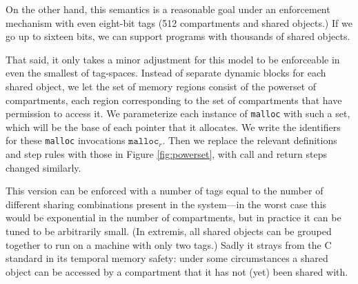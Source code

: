\documentclass{article}
\begin{document}
On the other hand, this semantics is a reasonable goal under an enforcement mechanism
with even eight-bit tags (512 compartments and shared objects.) If we go up to sixteen
bits, we can support programs with thousands of shared objects.

That said, it only takes a minor adjustment for this model to be enforceable in even
the smallest of tag-spaces. Instead of separate dynamic blocks for each shared
object, we let the set of memory regions consist of the powerset of compartments,
each region corresponding to the set of compartments that have permission to access it.
We parameterize each instance of {\tt malloc}
with such a set, which will be the base of each pointer that it allocates. We write
the identifiers for these {\tt malloc} invocations \(\mathtt{malloc}_r\).
Then we replace the relevant definitions and step rules with those in
Figure \ref{fig:powerset}, with call and return steps changed similarly.

This version can be enforced with a number of tags equal to the number of different
sharing combinations present in the system---in the worst case this would be
exponential in the number of compartments, but in practice it can be tuned to be
arbitrarily small. (In extremis, all shared objects can be grouped together to run
on a machine with only two tags.) Sadly it strays from the C standard in its
temporal memory safety: under some circumstances a shared object can be accessed
by a compartment that it has not (yet) been shared with.
\end{document}
